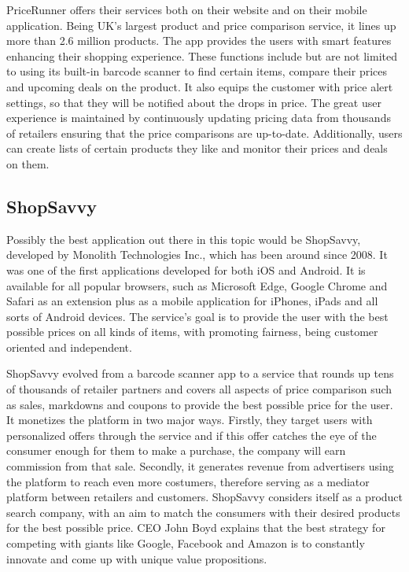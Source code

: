 PriceRunner offers their services both on their website and on their mobile application. Being UK's largest product and price comparison service, it lines up more than 2.6 million products. The app provides the users with smart features enhancing their shopping experience. These functions include but are not limited to using its built-in barcode scanner to find certain items, compare their prices and upcoming deals on the product. It also equips the customer with price alert settings, so that they will be notified about the drops in price. The great user experience is maintained by continuously updating pricing data from thousands of retailers ensuring that the price comparisons are up-to-date. Additionally, users can create lists of certain products they like and monitor their prices and deals on them. \cite{PriceRunnerApp2023}

\subsection{ShopSavvy}

Possibly the best application out there in this topic would be ShopSavvy, developed by Monolith Technologies Inc., which has been around since 2008. It was one of the first applications developed for both iOS and Android. It is available for all popular browsers, such as Microsoft Edge, Google Chrome and Safari as an extension plus as a mobile application for iPhones, iPads and all sorts of Android devices. The service's goal is to provide the user with the best possible prices on all kinds of items, with promoting fairness, being customer oriented and independent. \cite{ShopSavvyAbout}

ShopSavvy evolved from a barcode scanner app to a service that rounds up tens of thousands of retailer partners and covers all aspects of price comparison such as sales, markdowns and coupons to provide the best possible price for the user. It monetizes the platform in two major ways. Firstly, they target users with personalized offers through the service and if this offer catches the eye of the consumer enough for them to make a purchase, the company will earn commission from that sale. Secondly, it generates revenue from advertisers using the platform to reach even more costumers, therefore serving as a mediator platform between retailers and customers. ShopSavvy considers itself as a product search company, with an aim to match the consumers with their desired products for the best possible price. CEO John Boyd explains that the best strategy for competing with giants like Google, Facebook and Amazon is to constantly innovate and come up with unique value propositions. \cite{PymntsShopSavvy}

